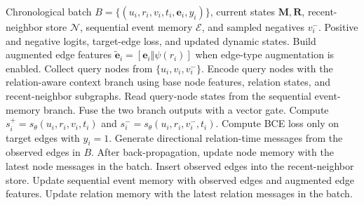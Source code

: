 \begin{algorithm}[t]
\caption{DHC edge-batch forward and chronological state update.}
\label{alg:dhc_forward}
\small
\begin{algorithmic}[1]
\Require Chronological batch $B=\{(u_i,r_i,v_i,t_i,\mathbf{e}_i,y_i)\}$, current states $\mathbf{M},\mathbf{R}$, recent-neighbor store $\mathcal{N}$, sequential event memory $\mathcal{E}$, and sampled negatives $v_i^{-}$.
\Ensure Positive and negative logits, target-edge loss, and updated dynamic states.
\State Build augmented edge features $\tilde{\mathbf{e}}_i=[\mathbf{e}_i\Vert\psi(r_i)]$ when edge-type augmentation is enabled.
\State Collect query nodes from $\{u_i,v_i,v_i^{-}\}$.
\State Encode query nodes with the relation-aware context branch using base node features, relation states, and recent-neighbor subgraphs.
\State Read query-node states from the sequential event-memory branch.
\State Fuse the two branch outputs with a vector gate.
\State Compute $s_i^{+}=s_\theta(u_i,r_i,v_i,t_i)$ and $s_i^{-}=s_\theta(u_i,r_i,v_i^{-},t_i)$.
\State Compute BCE loss only on target edges with $y_i=1$.
\State Generate directional relation-time messages from the observed edges in $B$.
\State After back-propagation, update node memory with the latest node messages in the batch.
\State Insert observed edges into the recent-neighbor store.
\State Update sequential event memory with observed edges and augmented edge features.
\State Update relation memory with the latest relation messages in the batch.
\end{algorithmic}
\end{algorithm}

